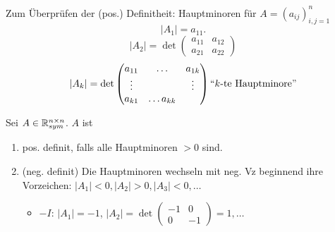 Zum Überprüfen der (pos.) Definitheit: Hauptminoren für $ A = (a_{ij} )_{i,j = 1}^n  $ 
\[
	\left| A_1 \right| = a_{11}.
\]
\[
	\left| A_2 \right| = \det \begin{pmatrix} a_{11} & a_{12} \\ a_{21} & a_{22} \end{pmatrix} 
\]
\[
	\left| A_k \right| = \det \begin{pmatrix} a_{11} & \hdots & a_{1k} \\ \vdots & & \vdots \\ a_{k1} & \hdots a_{kk}  \end{pmatrix} \text{``$ k $-te Hauptminore''} 
\]

\begin{theorem}[Hirwitz]
	Sei $ A \in \mathbb{R} _{sym} ^{n \times n}  $. $ A $ ist
	\begin{enumerate}[label=(\roman*)]
		\item pos. definit, falls alle Hauptminoren $ > 0 $ sind.
		\item (neg. definit) Die Hauptminoren wechseln mit neg. Vz beginnend ihre Vorzeichen:
			$ \left| A_1 \right| <0, \left| A_2 \right| > 0, \left| A_3 \right| < 0, \dotsc $
			\begin{itemize}
				\item $ -I $: $ \left| A_1 \right|  = -1 $, $ \left| A_2 \right| = \det \begin{pmatrix} -1  & 0 \\ 0 & -1 \end{pmatrix} = 1, \dotsc $ 
			\end{itemize}
	\end{enumerate}
\end{theorem}

